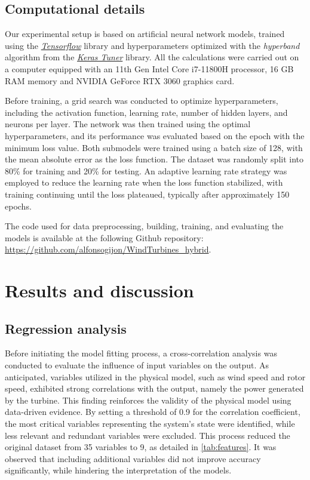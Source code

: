 \documentclass[preprint,12pt]{elsarticle}
\begin{document}
\subsection{Computational details}
Our experimental setup is based on artificial neural network models, trained using the \href{https://www.tensorflow.org/}{\emph{Tensorflow}} library and hyperparameters optimized with the \textit{hyperband} algorithm from the \href{https://keras.io/keras_tuner/}{\emph{Keras Tuner}} library. All the calculations were carried out on a computer equipped with an 11th Gen Intel Core i7-11800H processor, 16 GB RAM memory and NVIDIA GeForce RTX 3060 graphics card.

Before training, a grid search was conducted to optimize hyperparameters, including the activation function, learning rate, number of hidden layers, and neurons per layer. The network was then trained using the optimal hyperparameters, and its performance was evaluated based on the epoch with the minimum loss value. Both submodels were trained using a batch size of 128, with the mean absolute error as the loss function. The dataset was randomly split into 80\% for training and 20\% for testing. An adaptive learning rate strategy was employed to reduce the learning rate when the loss function stabilized, with training continuing until the loss plateaued, typically after approximately 150 epochs.

The code used for data preprocessing, building, training, and evaluating the models is available at the following Github repository:\\ \href{https://github.com/alfonsogijon/WindTurbines_hybrid}{https://github.com/alfonsogijon/WindTurbines\_hybrid}.

\section{Results and discussion}\label{sec:results}

\subsection{Regression analysis}
Before initiating the model fitting process, a cross-correlation analysis was conducted to evaluate the influence of input variables on the output. As anticipated, variables utilized in the physical model, such as wind speed and rotor speed, exhibited strong correlations with the output, namely the power generated by the turbine. This finding reinforces the validity of the physical model using data-driven evidence. By setting a threshold of 0.9 for the correlation coefficient, the most critical variables representing the system's state were identified, while less relevant and redundant variables were excluded. This process reduced the original dataset from 35 variables to 9, as detailed in \autoref{tab:features}. It was observed that including additional variables did not improve accuracy significantly, while hindering the interpretation of the models.
\end{document}

